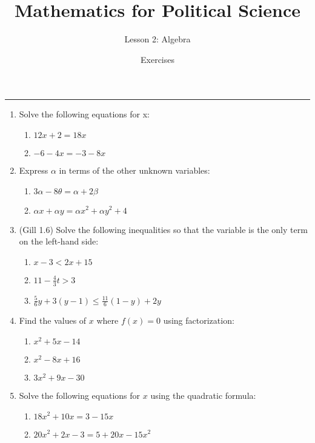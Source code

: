 \documentclass[11pt]{article}
\title{\Large{\bf{\vspace{-100pt}Mathematics for Political Science \vspace{-15pt}}}}
\author{\large{Lesson 2: Algebra}}
\date{\vspace{-5pt}\large{Exercises \vspace{-10pt}}}
\begin{document}
\maketitle

\hrule



\begin{enumerate}

\item Solve the following equations for x:
\begin{enumerate}
\item $12x + 2 = 18x$ %
\item $-6 - 4x = -3 - 8x$  %
\end{enumerate}


\item Express $\alpha$ in terms of the other unknown variables:
\begin{enumerate}
\item $3\alpha - 8\theta = \alpha + 2\beta$ %
\item $\alpha x + \alpha y = \alpha x^2 + \alpha y^2 + 4$ %
\end{enumerate}


\item (Gill 1.6) Solve the following inequalities so that the variable is the only term on the left-hand side:
\begin{enumerate}
\item $x - 3 < 2x + 15$  %
\item $11 - \frac{4}{3}t > 3$  %
\item $\frac{5}{6}y + 3(y-1) \leq \frac{11}{6}(1-y) + 2y$  %
\end{enumerate}


\item Find the values of $x$ where $f(x)=0$ using factorization:
\begin{enumerate}
\item $x^2 + 5x - 14$ %
\item $x^2 - 8x + 16$ %
\item $3x^2 + 9x - 30$ %
\end{enumerate}


\item Solve the following equations for $x$ using the quadratic formula:
\begin{enumerate}
\item $18x^2 + 10x = 3 - 15x$ %
\item $20x^2 + 2x - 3 = 5 + 20x - 15x^2$ %
\end{enumerate}



\end{enumerate}
\end{document}
